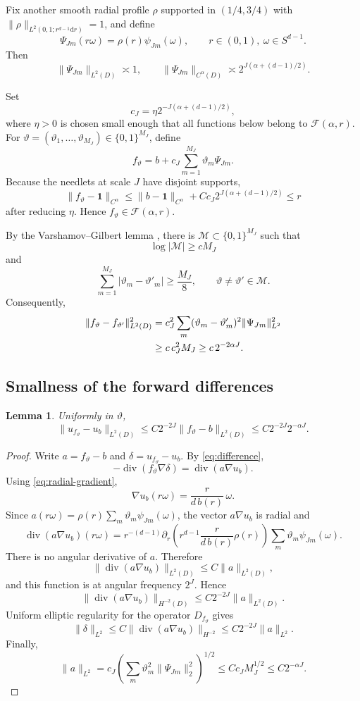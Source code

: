 \documentclass[11pt,a4paper]{article}
\newtheorem{lemma}[theorem]{Lemma}
\theoremstyle{remark}
\numberwithin{equation}{section}
\newcommand{\bone}{\mathbf 1}
\newcommand{\dd}{\mathrm d}
\newcommand{\Div}{\operatorname{div}}
\newcommand{\Fcal}{\mathcal F}
\begin{document}
Fix another smooth radial profile $\rho$ supported in $(1/4,3/4)$ with
$\|\rho\|_{L^2(0,1;r^{d-1}\dd r)}=1$, and define
\[
\Psi_{Jm}(r\omega)=\rho(r)\psi_{Jm}(\omega),
\qquad r\in(0,1),\ \omega\in S^{d-1}.
\]
Then
\[
\|\Psi_{Jm}\|_{L^2(D)}\asymp 1,
\qquad
\|\Psi_{Jm}\|_{C^\alpha(D)}
\asymp
2^{J(\alpha+(d-1)/2)}.
\]

Set
\[
c_J=\eta 2^{-J(\alpha+(d-1)/2)},
\]
where $\eta>0$ is chosen small enough that all functions below belong to
$\Fcal(\alpha,r)$. For
$\vartheta=(\vartheta_1,\ldots,\vartheta_{M_J})\in\{0,1\}^{M_J}$, define
\[
f_\vartheta
=
b+c_J\sum_{m=1}^{M_J}\vartheta_m\Psi_{Jm}.
\]
Because the needlets at scale $J$ have disjoint supports,
\[
\|f_\vartheta-\bone\|_{C^\alpha}
\leq
\|b-\bone\|_{C^\alpha}
+
Cc_J2^{J(\alpha+(d-1)/2)}
\leq r
\]
after reducing $\eta$. Hence $f_\vartheta\in\Fcal(\alpha,r)$.

By the Varshamov--Gilbert lemma \cite[Lemma 2.9]{Tsybakov}, there is
$\mathcal M\subset\{0,1\}^{M_J}$ such that
\[
\log|\mathcal M|\geq cM_J
\]
and
\[
\sum_{m=1}^{M_J}|\vartheta_m-\vartheta'_m|
\geq \frac{M_J}{8},
\qquad
\vartheta\neq\vartheta'\in\mathcal M.
\]
Consequently,
\begin{align}
\|f_\vartheta-f_{\vartheta'}\|_{L^2(D)}^2
&=
c_J^2\sum_m(\vartheta_m-\vartheta'_m)^2
\|\Psi_{Jm}\|_{L^2}^2
\notag\\
&\geq
c\,c_J^2M_J
\geq
c\,2^{-2\alpha J}.
\label{eq:packing-separation}
\end{align}

\subsection{Smallness of the forward differences}

\begin{lemma}\label{lem:angular-smoothing}
Uniformly in $\vartheta$,
\[
\|u_{f_\vartheta}-u_b\|_{L^2(D)}
\leq
C2^{-2J}\|f_\vartheta-b\|_{L^2(D)}
\leq
C2^{-2J}2^{-\alpha J}.
\]
\end{lemma}

\begin{proof}
Write $a=f_\vartheta-b$ and $\delta=u_{f_\vartheta}-u_b$. By
\eqref{eq:difference},
\[
-\Div(f_\vartheta\nabla\delta)
=
\Div(a\nabla u_b).
\]
Using \eqref{eq:radial-gradient},
\[
\nabla u_b(r\omega)=\frac{r}{d\,b(r)}\,\omega.
\]
Since $a(r\omega)=\rho(r)\sum_m\vartheta_m\psi_{Jm}(\omega)$, the vector
$a\nabla u_b$ is radial and
\[
\Div(a\nabla u_b)(r\omega)
=
r^{-(d-1)}
\partial_r\!\left(
r^{d-1}\frac{r}{d\,b(r)}\rho(r)
\right)
\sum_m\vartheta_m\psi_{Jm}(\omega).
\]
There is no angular derivative of $a$. Therefore
\[
\|\Div(a\nabla u_b)\|_{L^2(D)}\leq C\|a\|_{L^2(D)},
\]
and this function is at angular frequency $2^J$. Hence
\[
\|\Div(a\nabla u_b)\|_{H^{-2}(D)}
\leq
C2^{-2J}\|a\|_{L^2(D)}.
\]
Uniform elliptic regularity for the operator $D_{f_\vartheta}$ gives
\[
\|\delta\|_{L^2}
\leq
C\|\Div(a\nabla u_b)\|_{H^{-2}}
\leq
C2^{-2J}\|a\|_{L^2}.
\]
Finally,
\[
\|a\|_{L^2}
=
c_J\left(\sum_m\vartheta_m^2\|\Psi_{Jm}\|_2^2\right)^{1/2}
\leq
Cc_JM_J^{1/2}
\leq
C2^{-\alpha J}.
\]
\end{proof}
\end{document}
